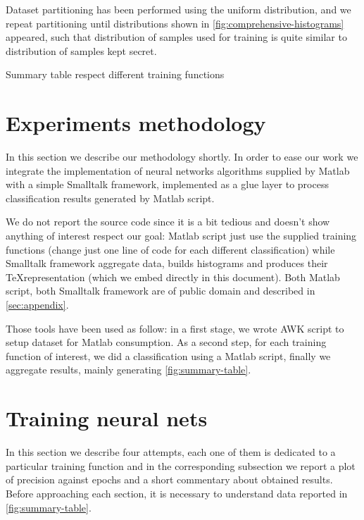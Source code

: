 \documentclass[10pt,a4paper]{article}
\begin{document}
    Dataset partitioning has been performed using the uniform distribution, and we 
    repeat partitioning until distributions shown in \autoref{fig:comprehensive-histograms}
    appeared, such that distribution of samples used for training is quite similar
    to distribution of samples kept secret.

    \begin{table}
      \begin{adjustwidth}{-4cm}{}
            
      \end{adjustwidth}
      \caption{Summary table respect different training functions}
      \label{fig:summary-table}
    \end{table}

    \section{Experiments methodology}
    In this section we describe our methodology shortly. In order to ease 
    our work we integrate the implementation of neural networks algorithms
    supplied by Matlab with a simple Smalltalk framework, implemented as a 
    glue layer to process classification results generated by Matlab script.
    
    We do not report the source code since it is a bit tedious and doesn't show
    anything of interest respect our goal: Matlab script just use the supplied
    training functions (change just one line of code for each different classification)
    while Smalltalk framework aggregate data, builds histograms and produces their
    \TeX representation (which we embed directly in this document). Both Matlab script,
    both Smalltalk framework are of public domain and described in \autoref{sec:appendix}.

    Those tools have been used as follow: in a first stage, we wrote AWK script 
    to setup dataset for Matlab consumption.
    As a second step, for each training function of interest, we did a classification
    using a Matlab script, finally we aggregate results, mainly generating \autoref{fig:summary-table}.

    \section{Training neural nets}
    In this section we describe four attempts, each one of them is dedicated
    to a particular training function and in the corresponding subsection 
    we report a plot of precision against epochs and a short commentary about 
    obtained results. Before approaching each section, it is necessary to understand
    data reported in \autoref{fig:summary-table}.
\end{document}
